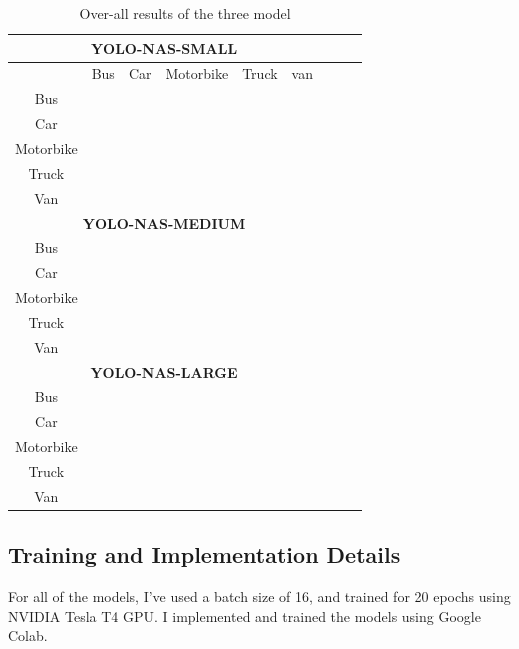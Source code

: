\begin{table}[htbp]
\centering
\caption{Over-all results of the three model}
\footnotesize
\begin{tabular}{|c|c|c|c|c|c|c|c|c|}%
\hline
\multicolumn{ 6}{|c|}{\textbf{YOLO-NAS-SMALL}}\\
\hline
\hline
 & Bus& Car& Motorbike& Truck& van \\
\hline
Bus& \cellcolor[HTML]{00FFFF}{0.23}& & & & \\
\hline
Car& & \cellcolor[HTML]{00FFFF}{0.77}& & & \\
\hline
Motorbike& & & \cellcolor[HTML]{00FFFF}{0.75}& & \\
\hline
Truck& & & & \cellcolor[HTML]{00FFFF}{0.73}& \\ 
\hline
Van& & & & & \cellcolor[HTML]{00FFFF}{0.68}\\
\hline
\hline
\multicolumn{ 6}{|c|}{\textbf{YOLO-NAS-MEDIUM}} \\ \hline
\hline
Bus& \cellcolor[HTML]{00FFFF}{0.37}& & & & \\
\hline
Car& & \cellcolor[HTML]{00FFFF}{0.81}& & & \\
\hline
Motorbike& & & \cellcolor[HTML]{00FFFF}{1.00}& & \\
\hline
Truck& & & & \cellcolor[HTML]{00FFFF}{0.78}& \\ 
\hline
Van& & & & & \cellcolor[HTML]{00FFFF}{0.67}\\
\hline
\hline
\multicolumn{ 6}{|c|}{\textbf{YOLO-NAS-LARGE}} \\ \hline
\hline
Bus& \cellcolor[HTML]{00FFFF}{0.69}& & & & \\
\hline
Car& &\cellcolor[HTML]{00FFFF}{0.86} & & & \\
\hline
Motorbike& & & \cellcolor[HTML]{00FFFF}{0.75} & & \\
\hline
Truck& & & &\cellcolor[HTML]{00FFFF}{0.72} & \\ 
\hline
Van& & & & &\cellcolor[HTML]{00FFFF}{0.63} \\
\hline
\end{tabular}
\end{table}


\subsection{Training and Implementation Details}
For all of the models, I’ve used a batch size of 16, and trained for 20 epochs using NVIDIA Tesla T4 GPU. I implemented and trained the models using Google Colab. 

